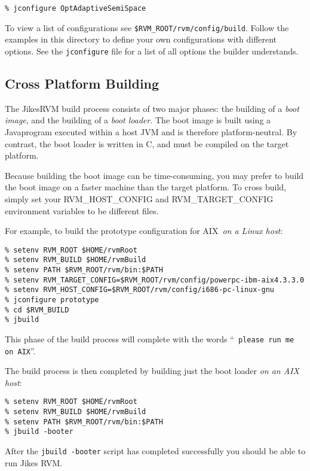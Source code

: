 \begin{verbatim}
% jconfigure OptAdaptiveSemiSpace
\end{verbatim}

To view a list of configurations see 
{\tt \$RVM\_ROOT/rvm/config/build}.  Follow the examples in this
directory to define your own configurations with different options.  See
the {\tt jconfigure} file for a list of all options the builder
understands.

\JikesTMFooter

\subsection{Cross Platform Building}

The Jikes\trademark RVM build process consists of two major phases:
the building of a 
{\em boot image}, and the building of a {\em boot loader}.
The boot image is built using a Java\trademark program executed within a host
JVM and is therefore platform-neutral.  By contrast, the boot loader
is written in C, and must be compiled on the target platform.

Because building the boot image can be time-consuming,
you may prefer to build the boot image
on a faster machine than the target platform.  To cross build, simply
set your 
RVM\_HOST\_CONFIG and RVM\_TARGET\_CONFIG environment variables to
be different files.

For example, to build the prototype configuration for AIX\AIXTMFootnote\
{\em on a Linux host}:
\begin{verbatim}
% setenv RVM_ROOT $HOME/rvmRoot
% setenv RVM_BUILD $HOME/rvmBuild
% setenv PATH $RVM_ROOT/rvm/bin:$PATH
% setenv RVM_TARGET_CONFIG=$RVM_ROOT/rvm/config/powerpc-ibm-aix4.3.3.0
% setenv RVM_HOST_CONFIG=$RVM_ROOT/rvm/config/i686-pc-linux-gnu
% jconfigure prototype
% cd $RVM_BUILD
% jbuild
\end{verbatim}

This phase of the build process will complete with the words ``{\tt
  please run me on AIX}''.


The build process is then completed by building just the boot loader {\em
  on an AIX host}:

\begin{verbatim}
% setenv RVM_ROOT $HOME/rvmRoot
% setenv RVM_BUILD $HOME/rvmBuild
% setenv PATH $RVM_ROOT/rvm/bin:$PATH
% jbuild -booter
\end{verbatim}

After the {\tt jbuild -booter} script has completed successfully you should be able 
to run Jikes RVM. 

